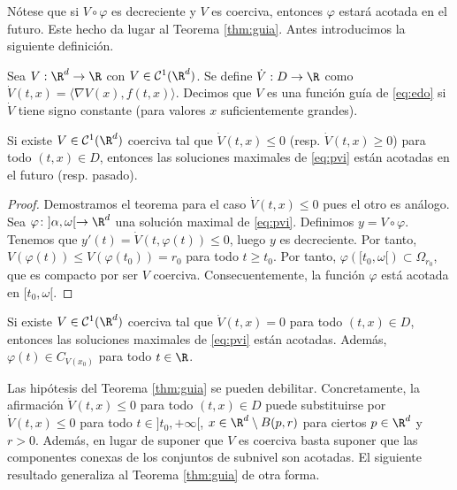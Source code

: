 \documentclass{article}
\begin{document}
Nótese que si $V \circ \varphi$ es decreciente y $V$ es coerciva, entonces $\varphi$ estará acotada
en el futuro. Este hecho da lugar al Teorema \ref{thm:guia}. Antes introducimos la siguiente
definición.

\begin{definition}
  Sea $V : \R^d \to \R$ con $V \in \mathcal{C}^1(\R^d)$. Se define $\dot{V}: D \to \R$ como
  $\dot{V}(t,x) = \langle \nabla V(x), f(t,x)\rangle$. Decimos que $V$ es una función guía de
  \eqref{eq:edo} si $\dot{V}$ tiene signo constante (para valores $x$ suficientemente grandes).
\end{definition}

\begin{theorem}
  \label{thm:guia}
  Si existe $V\in \mathcal{C}^1(\R^d)$ coerciva tal que $\dot{V}(t,x) \le 0$ (resp.
  $\dot{V}(t,x) \ge 0$) para todo $(t,x) \in D$, entonces las soluciones maximales de \eqref{eq:pvi}
  están acotadas en el futuro (resp. pasado).
\end{theorem}
\begin{proof}
  Demostramos el teorema para el caso $\dot{V}(t,x) \le 0$ pues el otro es análogo. Sea
  $\varphi \colon ]\alpha, \omega[ \to \R^d$ una solución maximal de \eqref{eq:pvi}. Definimos
  $y = V \circ \varphi$. Tenemos que $y'(t) = \dot{V}(t, \varphi(t)) \le 0$, luego $y$ es
  decreciente. Por tanto, $V(\varphi(t)) \le V(\varphi(t_0)) = r_0$ para todo $t \ge t_0$. Por
  tanto, $\varphi([t_0, \omega[) \subset \Omega_{r_0}$, que es compacto por ser $V$
  coerciva. Consecuentemente, la función $\varphi$ está acotada en $[t_0, \omega[$.
\end{proof}

\begin{corollary}
  Si existe $V\in \mathcal{C}^1(\R^d)$ coerciva tal que $\dot{V}(t,x) = 0$ para todo $(t,x) \in D$,
  entonces las soluciones maximales de \eqref{eq:pvi} están acotadas. Además,
  $\varphi(t) \in C_{V(x_0)}$ para todo $t \in \R$.
\end{corollary}

\begin{remark}
  Las hipótesis del Teorema \ref{thm:guia} se pueden debilitar. Concretamente, la afirmación
  $\dot{V}(t,x) \le 0$ para todo $(t,x) \in D$ puede substituirse por $\dot{V}(t,x) \le 0$ para todo
  $t \in ]t_0, +\infty[$, $x \in \R^d \setminus B(p, r)$ para ciertos $p \in \R^d$ y $ r >
  0$. Además, en lugar de suponer que $V$ es coerciva basta suponer que las componentes conexas de
  los conjuntos de subnivel son acotadas. El siguiente resultado generaliza al Teorema
  \ref{thm:guia} de otra forma.
\end{remark}
\end{document}
